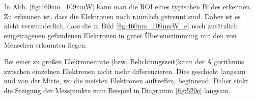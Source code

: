 \documentclass[bachelor,       %
               twoside,        %
               BCOR10mm,       %
               english,ngerman, %
               ]{GAUBM}
\begin{document}
In Abb. \ref{fig:460nm_109muW} kann man die ROI eines typischen Bildes erkennen.
Zu erkennen ist, dass die Elektronen noch räumlich getrennt sind.
Daher ist es nicht verwunderlich, dass die in Bild \ref{fig:460nm_109muW_e} noch zusätzlich eingetragenen gefundenen Elektronen in guter Übereinstimmung mit den von Menschen erkannten liegen.

Bei einer zu großen Elektronenrate (bzw. Belichtungszeit)kann der Algorithmus zwischen einzelnen Elektronen nicht mehr differenzieren.
Dies geschieht langsam und von der Mitte, wo die meisten Elektronen auftreffen, beginnend.
Daher sinkt die Steigung der Messpunkte zum Beispiel in Diagramm \ref{fig:520e} langsam.


\begin{figure}[h!]
  \centering
    \hfill
  \hfill

\end{figure}
\end{document}
